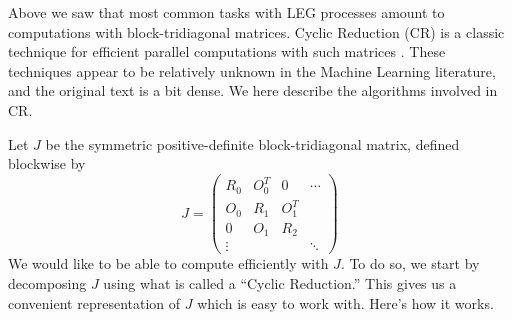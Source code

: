 \documentclass{article}
\theoremstyle{definition}
\begin{document}
Above we saw that most common tasks with LEG processes amount to computations with block-tridiagonal matrices.  Cyclic Reduction (CR) is a classic technique for efficient parallel computations with such matrices \cite{sweet1974generalized}.  These techniques appear to be relatively unknown in the Machine Learning literature, and the original text is a bit dense.  We here describe the algorithms involved in CR.

Let $J$ be the symmetric positive-definite block-tridiagonal matrix,
defined blockwise by 
\[
J=\left(\begin{array}{cccc}
R_{0} & O_{0}^{T} & 0 & \cdots\\
O_{0} & R_{1} & O_{1}^{T}\\
0 & O_{1} & R_{2}\\
\vdots &  &  & \ddots
\end{array}\right)
\]
We would like to be able to compute efficiently with $J$. To do so,
we start by decomposing $J$ using what is called a ``Cyclic Reduction.'' This gives
us a convenient representation of $J$ which is easy to work with.
Here's how it works.
\end{document}
